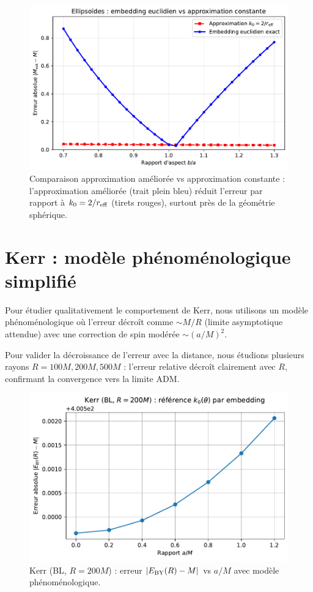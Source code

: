 \documentclass[11pt]{article}
\begin{document}
\begin{figure}[!htb]
\centering
\includegraphics[width=.75\linewidth]{fig_ellipsoids_embedding_comparison.pdf}
\caption{Comparaison approximation am\'elior\'ee vs approximation constante : l'approximation am\'elior\'ee (trait plein bleu) r\'eduit l'erreur par rapport \`a $k_0=2/r_{\rm eff}$ (tirets rouges), surtout pr\`es de la g\'eom\'etrie sph\'erique.}
\end{figure}
\clearpage

\section{Kerr : mod\`ele ph\'enom\'enologique simplifi\'e}
Pour \'etudier qualitativement le comportement de Kerr, nous utilisons un mod\`ele ph\'enom\'enologique o\`u l'erreur d\'ecro\^it comme $\sim M/R$ (limite asymptotique attendue) avec une correction de spin mod\'er\'ee $\sim (a/M)^2$.

Pour valider la d\'ecroissance de l'erreur avec la distance, nous \'etudions plusieurs rayons $R = 100M, 200M, 500M$ : l'erreur relative d\'ecro\^it clairement avec $R$, confirmant la convergence vers la limite ADM.

\begin{figure}[!htb]
\centering
\includegraphics[width=.75\linewidth]{fig_kerr_embedding_refined.pdf}
\caption{Kerr (BL, $R=200M$) : erreur $|E_{\rm BY}(R)-M|$ vs $a/M$ avec mod\`ele ph\'enom\'enologique.}
\end{figure}
\end{document}
